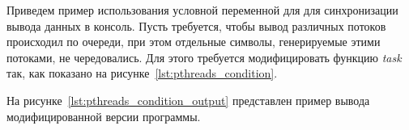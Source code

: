 Приведем пример использования условной переменной для для синхронизации вывода данных в консоль.
Пусть требуется, чтобы вывод различных потоков происходил по очереди,
при этом отдельные символы, генерируемые этими потоками, не чередовались.
Для этого требуется модифицировать функцию \textit{task} так, как показано на
рисунке~\ref{lst:pthreads_condition}.



На рисунке~\ref{lst:pthreads_condition_output} представлен пример вывода
модифицированной версии программы.


